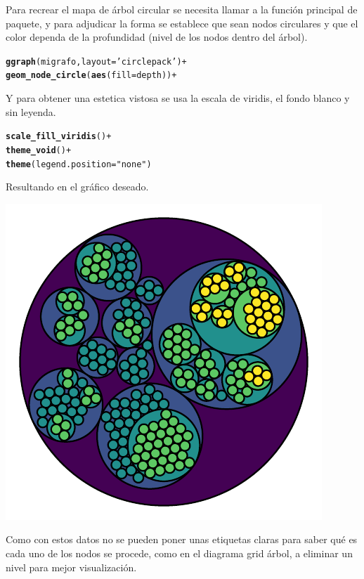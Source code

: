 \documentclass{article}\usepackage[]{graphicx}\usepackage[]{color}
\makeatletter
\def\maxwidth{ %
  \ifdim\Gin@nat@width>\linewidth
    \linewidth
  \else
    \Gin@nat@width
  \fi
}
\newcommand{\hlstr}[1]{\textcolor[rgb]{0.192,0.494,0.8}{#1}}%
\newcommand{\hlopt}[1]{\textcolor[rgb]{0,0,0}{#1}}%
\newcommand{\hlstd}[1]{\textcolor[rgb]{0.345,0.345,0.345}{#1}}%
\newcommand{\hlkwc}[1]{\textcolor[rgb]{0.333,0.667,0.333}{#1}}%
\newcommand{\hlkwd}[1]{\textcolor[rgb]{0.737,0.353,0.396}{\textbf{#1}}}%
\newenvironment{kframe}{%
 \def\at@end@of@kframe{}%
 \ifinner\ifhmode%
  \def\at@end@of@kframe{\end{minipage}}%
  \begin{minipage}{\columnwidth}%
 \fi\fi%
 \def\FrameCommand##1{\hskip\@totalleftmargin \hskip-\fboxsep
 \colorbox{shadecolor}{##1}\hskip-\fboxsep
     \hskip-\linewidth \hskip-\@totalleftmargin \hskip\columnwidth}%
 \MakeFramed {\advance\hsize-\width
   \@totalleftmargin\z@ \linewidth\hsize
   \@setminipage}}%
 {\par\unskip\endMakeFramed%
 \at@end@of@kframe}
\newenvironment{knitrout}{}{} %
\makeatother
\begin{document}
Para recrear el mapa de \'arbol circular se necesita llamar a la funci\'on principal de paquete, y para adjudicar la forma se establece que sean nodos circulares y que el color dependa de la profundidad (nivel de los nodos dentro del \'arbol).
\begin{knitrout}
\color{fgcolor}\begin{kframe}
\begin{alltt}
\hlkwd{ggraph}(migrafo, layout = \hlstr{'circlepack'}) +
  \hlkwd{geom_node_circle}(\hlkwd{aes}(fill = depth)) +
\end{alltt}
\end{kframe}
\end{knitrout}
Y para obtener una estetica vistosa se usa la escala de viridis, el fondo blanco y sin leyenda.
\begin{knitrout}
\color{fgcolor}\begin{kframe}
\begin{alltt}
  \hlkwd{scale_fill_viridis}\hlstd{()} \hlopt{+}
  \hlkwd{theme_void}\hlstd{()} \hlopt{+}
  \hlkwd{theme}\hlstd{(}\hlkwc{legend.position} \hlstd{=} \hlstr{"none"}\hlstd{)}
\end{alltt}
\end{kframe}
\end{knitrout}
Resultando en el gr\'afico deseado.
\begin{knitrout}
\color{fgcolor}

{\centering \includegraphics[width=\maxwidth]{figure/plot_ggraph-1} 

}



\end{knitrout}
Como con estos datos no se pueden poner unas etiquetas claras para saber qu\'e es cada uno de los nodos se procede, como en el diagrama grid \'arbol, a eliminar un nivel para mejor visualizaci\'on.
\end{document}
